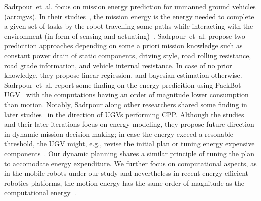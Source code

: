 Sadrpour~et~al. focus on mission energy prediction for unmanned ground vehicles (\Gls{acr:ugv}s). In their studies~\citep{sadrpour2013mission,sadrpour2013experimental}, the mission energy is the energy needed to complete a given set of tasks by the robot travelling some paths while interacting with the environment (in form of sensing and actuating)~\citep{sadrpour2013mission}. Sadrpour~et~al. propose two predicition approaches depending on some a priori mission knowledge such as constant power drain of static components, driving style, road rolling resistance, road grade information, and vehicle internal resistance. In case of no prior knowledge, they propose linear regiession, and bayesian estimation otherwise. Sadrpour~et~al. report some finding on the energy predicition using PackBot UGV~\citep{yamaichi2004packbot} with the computations having an order of magnitude lower consumption than motion. Notably, Sadrpour along other researchers shared some finding in later studies~\citep{sadrpour2014real,ersal2014keeping} in the direction of UGVs performing CPP. Although the studies and their later iterations focus on energy modeling, they propose future direction in dynamic mission decision making; in case the energy exceed a resonable threshold, the UGV might, e.g., revise the initial plan or tuning energy expensive components~\citep{sadrpour2013mission}. Our dynamic planning shares a similar principle of tuning the plan to accomodate energy expenditure. We further focus on computational aspects, as in the mobile robots under our study and nevertheless in recent energy-efficient robotics platforms, the motion energy has the same order of magnitude as the computational energy~\citep{sudhakar2020balancing}.   

